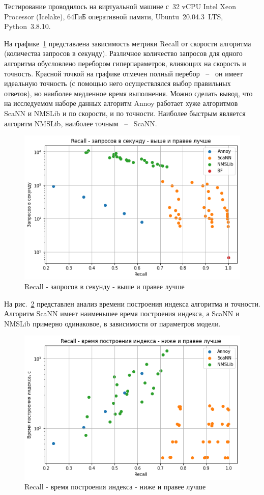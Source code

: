 \documentclass[a4paper,14pt]{article}
\begin{document}
    Тестирование проводилось на виртуальной машине с~32 vCPU Intel Xeon Processor (Icelake), 64ГиБ оперативной памяти, Ubuntu~20.04.3~LTS, Python~3.8.10.

    На графике~\ref{fig:ann_recall_qps} представлена зависимость метрики Recall от скорости алгоритма (количества запросов в секунду).
    Различное количество запросов для одного алгоритма обусловлено перебором гиперпараметров, влияющих на скорость и точность.
    Красной точкой на графике отмечен полный перебор ~--~ он имеет идеальную точность (с помощью него осуществлялся выбор правильных ответов), но наиболее медленное время выполнения.
    Можно сделать вывод, что на исследуемом наборе данных алгоритм Annoy работает хуже алгоритмов ScaNN и NMSLib и по скорости, и по точности.
    Наиболее быстрым является алгоритм NMSLib, наиболее точным ~--~ ScaNN.

    \begin{figure}[H]
        \centering
        \includegraphics[width=0.7\linewidth]{images/ann_recall_qps}
        \caption{Recall - запросов в секунду - выше и правее лучше}
        \label{fig:ann_recall_qps}
    \end{figure}

    На рис.~\ref{fig:ann_recall_build} представлен анализ времени построения индекса алгоритма и точности.
    Алгоритм ScaNN имеет наименьшее время построения индекса, а ScaNN и NMSLib примерно одинаковое, в зависимости от параметров модели.

    \begin{figure}[H]
        \centering
        \includegraphics[width=0.7\linewidth]{images/ann_recall_build}
        \caption{Recall - время построения индекса - ниже и правее лучше}
        \label{fig:ann_recall_build}
    \end{figure}
\end{document}
